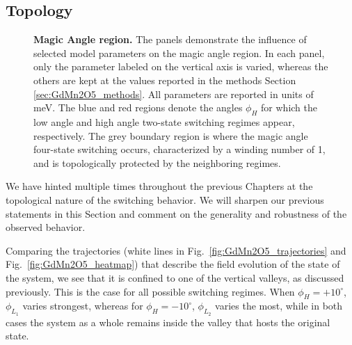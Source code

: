 \subsection{Topology \label{sec:GdMn2O5_topology}}
\begin{figure}
	\caption{\label{fig:GdMn2O5_windingvsparam} {\bf Magic Angle region.} The panels demonstrate the influence of selected model parameters on the magic angle region. In each panel, only the parameter labeled on the vertical axis is varied, whereas the others are kept at the values reported in the methods Section \ref{sec:GdMn2O5_methods}. All parameters are reported in units of meV. The blue and red regions denote the angles $\phi_H$ for which the low angle and high angle two-state switching regimes appear, respectively. The grey boundary region is where the magic angle four-state switching occurs, characterized by a winding number of 1, and is topologically protected by the neighboring regimes.}
\end{figure}
We have hinted multiple times throughout the previous Chapters at the topological nature of the switching behavior.
We will sharpen our previous statements in this Section and comment on the generality and robustness of the observed behavior.

Comparing the trajectories (white lines in Fig.~\ref{fig:GdMn2O5_trajectories} and Fig.~\ref{fig:GdMn2O5_heatmap}) that describe the field evolution of the state of the system, we see that it is confined to one of the vertical valleys, as discussed previously.
This is the case for all possible switching regimes. When $\phi_H = +10^\circ$, $\phi_{L_1}$ varies strongest, whereas for $\phi_H = -10^\circ$, $\phi_{L_2}$ varies the most, while in both cases the system as a whole remains inside the valley that hosts the original state.

